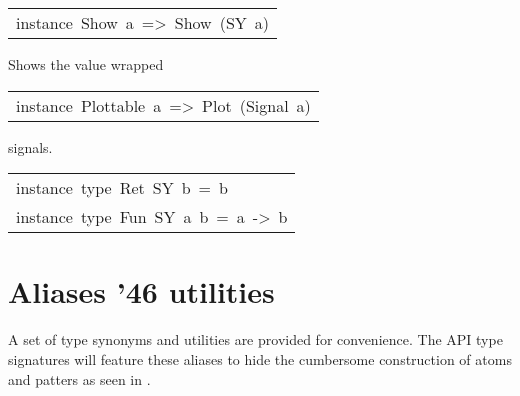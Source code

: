 \begin{haddockdesc}
\item[\begin{tabular}{@{}l}
instance\ Show\ a\ =>\ Show\ (SY\ a)
\end{tabular}]\haddockbegindoc
Shows the value wrapped\par

\end{haddockdesc}
\begin{haddockdesc}
\item[\begin{tabular}{@{}l}
instance\ Plottable\ a\ =>\ Plot\ (Signal\ a)
\end{tabular}]\haddockbegindoc
{} signals.\par

\end{haddockdesc}
\begin{haddockdesc}
\item[\begin{tabular}{@{}l}
instance\ type\ Ret\ SY\ b\ =\ b\\instance\ type\ Fun\ SY\ a\ b\ =\ a\ ->\ b
\end{tabular}]
\end{haddockdesc}
\section{Aliases {\char '46} utilities}
A set of type synonyms and utilities are provided for
 convenience. The API type signatures will feature these aliases
 to hide the cumbersome construction of atoms and patters as seen
 in .\par

